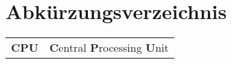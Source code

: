 \chapter{Abkürzungsverzeichnis}

\begin{center}
\begin{tabular}{rl}
\textbf{CPU} & \textbf{C}entral \textbf{P}rocessing \textbf{U}nit \\ 
\end{tabular}
\end{center}
 